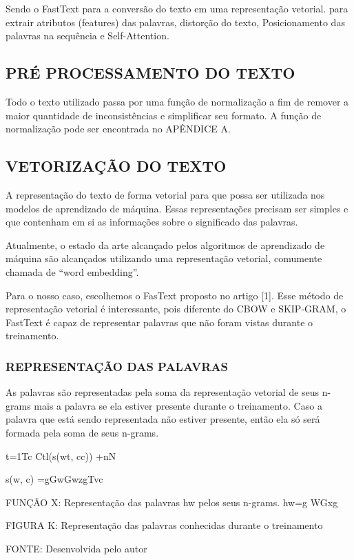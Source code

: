 Sendo o FastText para a conversão do texto em uma representação vetorial.
para extrair atributos (features) das palavras, distorção do texto, Posicionamento das palavras na sequência e Self-Attention.

\subsection{PRÉ PROCESSAMENTO DO TEXTO}

Todo o texto utilizado passa por uma função de normalização a fim de remover a maior quantidade de inconsistências e simplificar seu formato. A função de normalização pode ser encontrada no APÊNDICE A.

\subsection{VETORIZAÇÃO DO TEXTO}

A representação do texto de forma vetorial para que possa ser utilizada nos modelos de aprendizado de máquina. Essas representações precisam ser simples e que contenham em si as informações sobre o significado das palavras.

Atualmente, o estado da arte alcançado pelos algoritmos de aprendizado de máquina são alcançados utilizando uma representação vetorial, comumente chamada de “word embedding”.

Para o nosso caso, escolhemos o FasText proposto no artigo [1]. Esse método de representação vetorial é interessante, pois diferente do CBOW e SKIP-GRAM, o FastText é capaz de representar palavras que não foram vistas durante o treinamento.

\subsubsection{REPRESENTAÇÃO DAS PALAVRAS}
As palavras são representadas pela soma da representação vetorial de seus n-grams mais a palavra se ela estiver presente durante o treinamento. Caso a palavra que está sendo representada não estiver presente, então ela só será formada pela soma de seus n-grams.

t=1Tc  Ctl(s(wt, cc)) +nN

s(w, c) =gGwGwzgTvc

FUNÇÃO X: Representação das palavras hw pelos seus n-grams. 
hw=g  WGxg

FIGURA K: Representação das palavras conhecidas durante o treinamento

FONTE: Desenvolvida pelo autor

